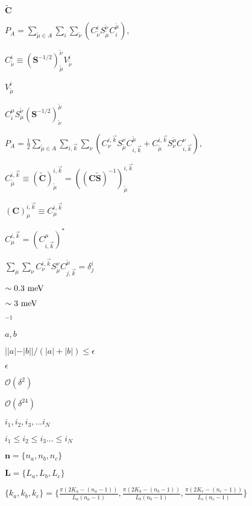 \documentclass{article}
\begin{document}
$ \mathbf{\tilde{C}} $
\pagebreak

$ P_A = \sum_{\tilde{\mu} \in A} \sum_i \sum_{\tilde{\nu}} \left( C^i_{\tilde{\nu}} S^{\tilde{\nu}}_{\tilde{\mu}} C^{\tilde{\mu}}_i \right), $
\pagebreak

$ C_{\tilde{\nu}}^i \equiv (\mathbf{S}^{-1/2})^{\tilde{\nu}}_{\tilde{\mu}} V^i_{\tilde{\nu}} $
\pagebreak

$ V^i_{\tilde{\mu}} $
\pagebreak

$ C_i^\mu S^{\tilde{\nu}}_{\mu} (\mathbf{S}^{-1/2})^{\tilde{\mu}}_{\tilde{\nu}} $
\pagebreak

$ P_A = \frac{1}{2} \sum_{\tilde{\mu} \in A} \sum_{i,\vec{k}} \sum_\nu \left( C^{i,\vec{k}}_{\nu} S^{\nu}_{\tilde{\mu}} C^{\tilde{\mu}}_{i,\vec{k}} + C_{\tilde{\mu}}^{i,\vec{k}} S_{\nu}^{\tilde{\mu}} C_{i,\vec{k}}^{\nu} \right), $
\pagebreak

$ C_{\tilde{\mu}}^{i,\vec{k}} \equiv \left(\mathbf{\tilde{C}}\right)_{\tilde{\mu}}^{i,\vec{k}} = \left(\left(\mathbf{C} \mathbf{\tilde{S}}\right)^{-1}\right)_{\tilde{\mu}}^{i,\vec{k}} $
\pagebreak

$ \left(\mathbf{C}\right)^{i,\vec{k}}_\mu \equiv C^{i,\vec{k}}_\mu $
\pagebreak

$ C^{i,\vec{k}}_\mu = \left( C_{i,\vec{k}}^\mu \right)^* $
\pagebreak

$ \sum_{\mu} \sum_\nu C^{i,\vec{k}}_{\nu} S^{\nu}_{\tilde{\mu}} C^{\tilde{\mu}}_{j,\vec{k}} = \delta^i_j $
\pagebreak

$ \sim 0.3~{\rm meV} $
\pagebreak

$ \sim 3~{\rm meV} $
\pagebreak

$^{-1}$
\pagebreak

$ a,b $
\pagebreak

$ ||a|-|b||/(|a|+|b|) \leq \epsilon $
\pagebreak

$ \epsilon $
\pagebreak

$ \mathcal{O}(\delta^2) $
\pagebreak

$ \mathcal{O}(\delta^24) $
\pagebreak

$ {i_1, i_2, i_3, ... i_N} $
\pagebreak

$ i_1 \leq i_2 \leq i_3 ... \leq i_N $
\pagebreak

$ \mathbf{n} = \{n_a, n_b, n_c\} $
\pagebreak

$ \mathbf{L} = \{ L_a, L_b, L_c \} $
\pagebreak

$ \{k_a, k_b, k_c\} = \{ \frac{\pi (2 K_a - (n_a-1))}{L_a (n_a-1)}, \frac{\pi (2 K_b - (n_b-1))}{L_b (n_b-1)}, \frac{\pi (2 K_c - (n_c-1))}{L_c (n_c-1)} \} $
\pagebreak
\end{document}
